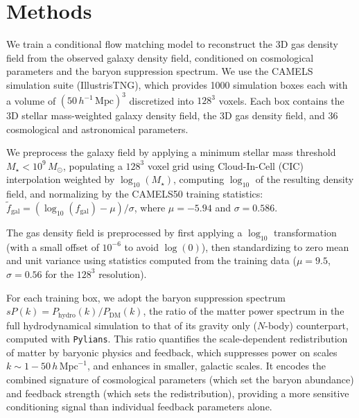 \documentclass[twocolumn]{aastex631}
\begin{document}
\figCigar


\section{Methods}
\label{sec:methods}

We train a conditional flow matching model to reconstruct the 3D gas density field from the observed galaxy density field, conditioned on cosmological parameters and the baryon suppression spectrum. We use the CAMELS simulation suite (IllustrisTNG), which provides 1000 simulation boxes each with a volume of $(50\,h^{-1}\,\mathrm{Mpc})^3$ discretized into $128^3$ voxels. Each box contains the 3D stellar mass-weighted galaxy density field, the 3D gas density field, and 36 cosmological and astronomical parameters.

We preprocess the galaxy field by applying a minimum stellar mass threshold $M_{\star} < 10^9\,M_\odot$, populating a $128^3$ voxel grid using Cloud-In-Cell (CIC) interpolation weighted by $\log_{10}(M_{\star})$, computing $\log_{10}$ of the resulting density field, and normalizing by the CAMELS50 training statistics: $\tilde{f}_{\mathrm{gal}} = (\log_{10}(f_{\mathrm{gal}}) - \mu)/\sigma$, where $\mu = -5.94$ and $\sigma = 0.586$.

The gas density field is preprocessed by first applying a $\log_{10}$ transformation (with a small offset of $10^{-6}$ to avoid $\log(0)$), then standardizing to zero mean and unit variance using statistics computed from the training data ($\mu = 9.5$, $\sigma = 0.56$ for the $128^3$ resolution).


For each training box, we adopt the baryon suppression spectrum $sP(k) = P_\mathrm{hydro}(k)/P_\mathrm{DM}(k)$, the ratio of the matter power spectrum in the full hydrodynamical simulation to that of its gravity only ($N$-body) counterpart, computed with \texttt{Pylians}\citep{villaescusa-navarro2018}. This ratio quantifies the scale-dependent redistribution of matter by baryonic physics and feedback, which suppresses power on scales $k \sim 1 - 50\,h\,\mathrm{Mpc}^{-1}$, and enhances in smaller, galactic scales\citep{genel2026}. It encodes the combined signature of cosmological parameters (which set the baryon abundance) and feedback strength (which sets the redistribution), providing a more sensitive conditioning signal than individual feedback parameters alone.
\end{document}
